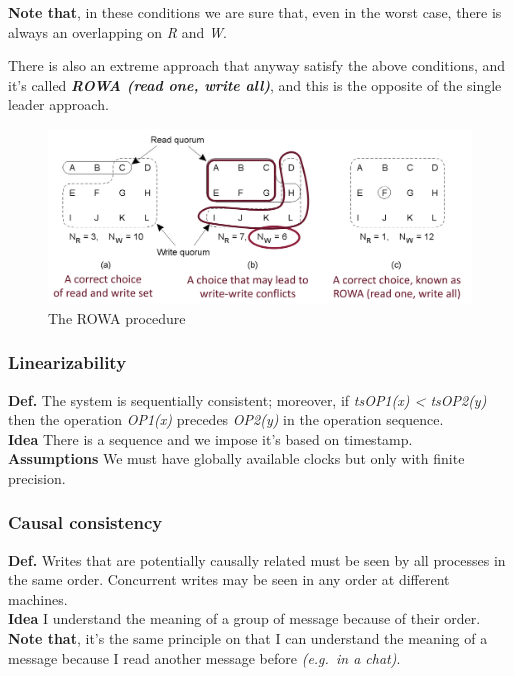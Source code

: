\textbf{Note that}, in these conditions we are sure that, even in the worst case, there is
always an overlapping on \emph{R} and \emph{W}.

There is also an extreme approach that anyway satisfy the above
conditions, and it's called \textbf{\emph{ROWA (read one, write all)}},
and this is the opposite of the single leader approach.

\begin{figure}[htbp]
    \centering
    \includegraphics[width=\textwidth]{src/images/consistency-replication/rowa.png}
    \caption{The ROWA procedure}
\end{figure}

\subsubsection{Linearizability}

\textbf{Def.} The system is sequentially consistent; moreover, if
\emph{tsOP1(x) \textless{} tsOP2(y)} then the operation \emph{OP1(x)}
precedes \emph{OP2(y)} in the operation sequence.\\
\textbf{Idea} There is a sequence and we impose it's based on timestamp.\\
\textbf{Assumptions} We must have globally available clocks but only with finite precision.

\subsubsection{Causal consistency}

\textbf{Def.} Writes that are potentially causally related must be seen
by all processes in the same order. Concurrent writes may be seen in any
order at different machines.\\
\textbf{Idea} I understand the meaning of a group of message because of
their order.\\
\textbf{Note that}, it's the same principle on that I can understand the meaning of a
message because I read another message before \emph{(e.g.~in a chat)}.

